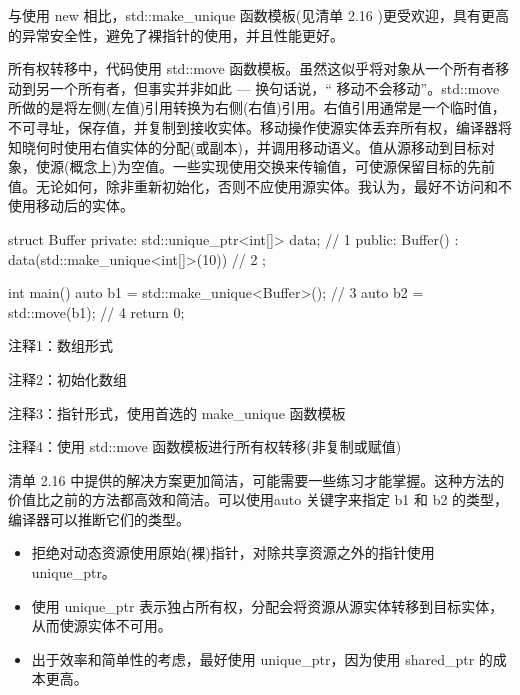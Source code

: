 与使用 new 相比，std::make\_unique 函数模板(见清单 2.16 )更受欢迎，具有更高的异常安全性，避免了裸指针的使用，并且性能更好。

所有权转移中，代码使用 std::move 函数模板。虽然这似乎将对象从一个所有者移动到另一个所有者，但事实并非如此 — 换句话说，“ 移动不会移动”。std::move 所做的是将左侧(左值)引用转换为右侧(右值)引用。右值引用通常是一个临时值，不可寻址，保存值，并复制到接收实体。移动操作使源实体丢弃所有权，编译器将知晓何时使用右值实体的分配(或副本)，并调用移动语义。值从源移动到目标对象，使源(概念上)为空值。一些实现使用交换来传输值，可使源保留目标的先前值。无论如何，除非重新初始化，否则不应使用源实体。我认为，最好不访问和不使用移动后的实体。


\begin{cpp}
struct Buffer {
private:
  std::unique_ptr<int[]> data; // 1
public:
  Buffer() : data(std::make_unique<int[]>(10)) {} // 2
};

int main() {
  auto b1 = std::make_unique<Buffer>(); // 3
  auto b2 = std::move(b1); // 4
  return 0;
}
\end{cpp}

{\footnotesize
注释1：数组形式

注释2：初始化数组

注释3：指针形式，使用首选的 make\_unique 函数模板

注释4：使用 std::move 函数模板进行所有权转移(非复制或赋值)
}

清单 2.16 中提供的解决方案更加简洁，可能需要一些练习才能掌握。这种方法的价值比之前的方法都高效和简洁。可以使用auto 关键字来指定 b1 和 b2 的类型，编译器可以推断它们的类型。


\begin{itemize}
\item
拒绝对动态资源使用原始(裸)指针，对除共享资源之外的指针使用 unique\_ptr。

\item
使用 unique\_ptr 表示独占所有权，分配会将资源从源实体转移到目标实体，从而使源实体不可用。

\item
出于效率和简单性的考虑，最好使用 unique\_ptr，因为使用 shared\_ptr 的成本更高。
\end{itemize}













